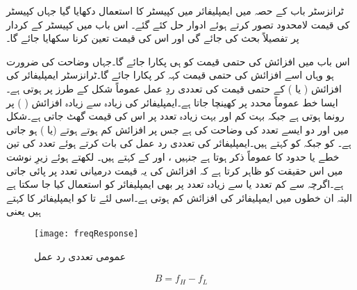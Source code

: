 
ٹرانزسٹر باب کے حصہ  میں ایمپلیفائر میں کپیسٹر کا استعمال دکھایا گیا جہاں کپیسٹر کی قیمت لامحدود تصور کرتے ہوئے ادوار حل کئے گئے۔ اس باب میں کپیسٹر کے کردار پر تفصیلاً بحث کی جائے گی اور اس کی قیمت تعین کرنا سکھایا جائے گا۔

اس باب میں افزائش کی حتمی قیمت  کو  ہی پکارا جائے گا۔جہاں وضاحت کی ضرورت ہو وہاں اسے افزائش کی حتمی قیمت کہہ کر پکارا جائے گا۔ٹرانزسٹر ایمپلیفائر کی افزائش  ( یا  ) کے حتمی قیمت کی تعددی ردِ عمل عموماً شکل  کے طرز پر ہوتی ہے۔ایسا خط عموماً  محدد پر کھینچا جاتا ہے۔ایمپلیفائر کی زیادہ سے زیادہ افزائش   ( )  پر رونما ہوتی ہے جبکہ بہت کم اور بہت زیادہ تعدد پر اس کی قیمت گھٹ جاتی ہے۔شکل میں  اور  دو ایسے تعدد کی وضاحت کی ہے جس پر افزائش کم ہوتے ہوتے   (یا  ) ہو جاتی ہے۔    کو  جبکہ   کو   کہتے ہیں۔ایمپلیفائر کی تعددی رد عمل کی بات کرتے ہوئے تعدد کی تین خطے یا حدود کا عموماً ذکر ہوتا ہے جنہیں ،  اور  کے   کہتے ہیں۔ لکھتے ہوئے زیرِ نوشت میں  اس حقیقت کو ظاہر کرتا ہے کہ افزائش کی یہ قیمت درمیانی تعدد پر پائی جاتی ہے۔اگرچہ  سے کم تعدد یا  سے زیادہ تعدد پر بھی ایمپلیفائر کو  استعمال کیا جا سکتا ہے البتہ ان خطوں میں ایمپلیفائر کی افزائش کم ہوتی ہے۔اسی لئے   تا  کو  ایمپلیفائر کا    کہتے ہیں  یعنی
\begin{figure}
\centering
\texttt{[image: freqResponse]}
\caption{عمومی تعددی رد عمل}
\label{شکل_عمومی_تعددی_ردعمل}
\end{figure}
%
\begin{align} \label{مساوات_تعددی_ردعمل_دائرہ_کارکردگی}
B=f_H - f_L
\end{align}
